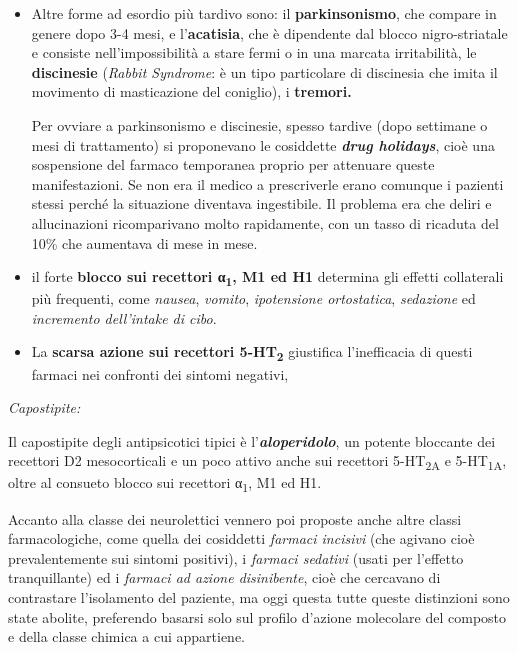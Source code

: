 \documentclass[]{article}
\begin{document}
\begin{itemize}
\item
  Altre forme ad esordio più tardivo sono: il \textbf{parkinsonismo},
  che compare in genere dopo 3-4 mesi, e l'\textbf{acatisia}, che è
  dipendente dal blocco nigro-striatale e consiste nell'impossibilità a
  stare fermi o in una marcata irritabilità, le \textbf{discinesie}
  (\emph{Rabbit Syndrome}: è un tipo particolare di discinesia che imita
  il movimento di masticazione del coniglio), i \textbf{tremori.}

  Per ovviare a parkinsonismo e discinesie, spesso tardive (dopo
  settimane o mesi di trattamento) si proponevano le cosiddette
  \emph{\textbf{drug holidays}}, cioè una sospensione del farmaco
  temporanea proprio per attenuare queste manifestazioni. Se non era il
  medico a prescriverle erano comunque i pazienti stessi perché la
  situazione diventava ingestibile. Il problema era che deliri e
  allucinazioni ricomparivano molto rapidamente, con un tasso di
  ricaduta del 10\% che aumentava di mese in mese.
\end{itemize}

\begin{itemize}
\item
  il forte \textbf{blocco sui recettori α\textsubscript{1}, M1 ed H1}
  determina gli effetti collaterali più frequenti, come \emph{nausea},
  \emph{vomito}, \emph{ipotensione ortostatica}, \emph{sedazione} ed
  \emph{incremento dell'intake di cibo}.
\item
  La \textbf{scarsa azione sui recettori 5-HT\textsubscript{2}}
  giustifica l'inefficacia di questi farmaci nei confronti dei sintomi
  negativi,
\end{itemize}

\emph{\emph{Capostipite:}}

Il capostipite degli antipsicotici tipici è
l'\textbf{\emph{aloperidolo}}, un potente bloccante dei recettori D2
mesocorticali e un poco attivo anche sui recettori
5-HT\textsubscript{2A} e 5-HT\textsubscript{1A}, oltre al consueto
blocco sui recettori α\textsubscript{1}, M1 ed H1.

Accanto alla classe dei neurolettici vennero poi proposte anche altre
classi farmacologiche, come quella dei cosiddetti \emph{farmaci
incisivi} (che agivano cioè prevalentemente sui sintomi positivi), i
\emph{farmaci sedativi} (usati per l'effetto tranquillante) ed i
\emph{farmaci ad azione disinibente}, cioè che cercavano di contrastare
l'isolamento del paziente, ma oggi questa tutte queste distinzioni sono
state abolite, preferendo basarsi solo sul profilo d'azione molecolare
del composto e della classe chimica a cui appartiene.
\end{document}
